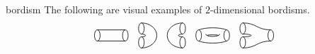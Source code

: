 \begin{example}{bordism}
    The following are visual examples of $2$-dimensional bordisms.
    \[  \begin{tikzpicture}[semithick, scale=0.5, baseline=-0.5ex] \begin{scope} \draw (-1,0) ellipse (0.2cm and 0.4cm); \draw (-1,0.4) -- (1,0.4); \draw (-1,-0.4) -- (1,-0.4); \draw (1,0) ellipse (0.2cm and 0.4cm); \end{scope} \end{tikzpicture}
        \quad
        \begin{tikzpicture}[semithick, scale=0.5, baseline=-0.5ex] \begin{scope} \draw (0,0.5) ellipse (0.2cm and 0.4cm); \draw (0,-0.5) ellipse (0.2cm and 0.4cm); \draw (0,0.9) arc (90:-90:1.1cm and 0.9cm); \draw (0,0.1) arc (90:-90:0.3cm and 0.1cm); \end{scope} \end{tikzpicture}
        \quad
        \begin{tikzpicture}[semithick, scale=0.5, baseline=-0.5ex] \begin{scope} \draw (0,0.5) ellipse (0.2cm and 0.4cm);\draw (0,-0.5) ellipse (0.2cm and 0.4cm); \draw (0,0.9) arc (90:270:1.1cm and 0.9cm); \draw (0,0.1) arc (90:270:0.3cm and 0.1cm); \end{scope} \end{tikzpicture}
        \quad
        \begin{tikzpicture}[semithick, scale=0.5, baseline=-0.5ex] \begin{scope} \draw (-1,0) ellipse (0.2cm and 0.4cm); \draw (-1,0.4) .. controls (-0.5,0.6) and (0.5,0.6) .. (1,0.4); \draw (-1,-0.4) .. controls (-0.5,-0.6) and (0.5,-0.6) .. (1,-0.4); \draw (-0.5,0.1) .. controls (-0.5,-0.125) and (0.5,-0.125) .. (0.5,0.1); \draw (-0.4,0.0) .. controls (-0.4,0.0625) and (0.4,0.0625) .. (0.4,0.0); \draw (1,0) ellipse (0.2cm and 0.4cm); \end{scope} \end{tikzpicture}
        \quad
        \begin{tikzpicture}[semithick, scale=0.5, baseline=-0.5ex] \begin{scope} \draw (-1,0.5) ellipse (0.2cm and 0.4cm); \draw (-1,-0.5) ellipse (0.2cm and 0.4cm); \draw (1,0) ellipse (0.2cm and 0.4cm); \draw (-1,0.9) .. controls (0,0.9) and (0,0.4) .. (1,0.4); \draw (-1,-0.9) .. controls (0,-0.9) and (0,-0.4) .. (1,-0.4); \draw (-1,0.1) .. controls (-0.2,0.1) and (-0.2,-0.1) .. (-1,-0.1); \end{scope} \end{tikzpicture}
\]
\end{example}
